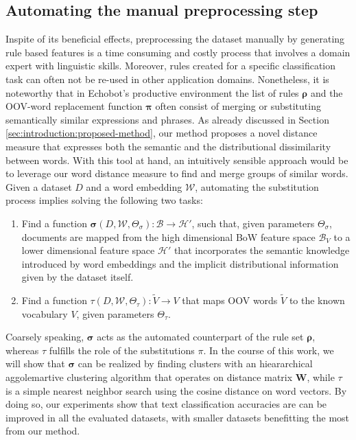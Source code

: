 \subsection{Automating the manual preprocessing step}

Inspite of its beneficial effects, preprocessing the dataset manually by
generating rule based features is a time consuming and costly process that
involves a domain expert with linguistic skills.
Moreover, rules created for a specific classification task can often not be re-used in
other application domains. Nonetheless, it is noteworthy that in Echobot's
productive environment the list of rules $\boldsymbol\rho$ and the OOV-word replacement 
function $\boldsymbol\pi$ often consist of merging or substituting semantically similar expressions and phrases.
As already discussed in Section \ref{sec:introduction:proposed-method}, our
method proposes a novel distance measure that expresses both the semantic and
the distributional dissimilarity between words. With this tool at hand, an
intuitively sensible approach would be to leverage our word distance measure to
find and merge groups of similar words.
Given a dataset $D$ and a word embedding $\mathcal{W}$, automating the substitution process
implies solving the following two tasks:

\begin{enumerate}
  \item Find a function $\boldsymbol\sigma(D,\mathcal{W},\Theta_\sigma):
  \mathcal{B} \to \mathcal{H'}$, such that, given parameters $\Theta_\sigma$,
  documents are mapped from the high dimensional BoW feature space
  $\mathcal{B}_V$ to a lower dimensional feature space $\mathcal{H'}$ that
  incorporates the semantic knowledge introduced by word embeddings and the implicit
  distributional information given by the dataset itself.
  
  \item Find a function $\tau(D,\mathcal{W}, \Theta_\tau): \tilde{V} \to V$ that
  maps OOV words $\tilde{V}$  to the known vocabulary $V$, given parameters
  $\Theta_\tau$.
  \end{enumerate}
  
  Coarsely speaking, $\boldsymbol\sigma$ acts as the automated counterpart of the
  rule set $\boldsymbol\rho$, whereas $\tau$ fulfills the role of the substitutions
  $\pi$.  
  In the course of this work, we will show that $\boldsymbol\sigma$ can
  be realized by finding clusters with an hieararchical aggolemartive clustering
  algorithm that operates on distance matrix $\mathbf{W}$, while $\tau$ is a
  simple nearest neighbor search using the cosine distance on word vectors.  
  By doing so, our experiments show that text classification accuracies are
  can be improved in all the evaluated datasets, with smaller datasets benefitting the most from
  our method.
